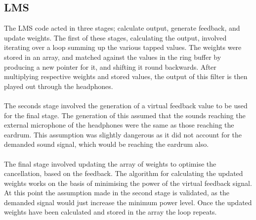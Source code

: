 \subsection{LMS}
\label{ssec:implelms}
The LMS code acted in three stages; calculate output, generate feedback, and update weights.
The first of these stages, calculating the output, involved iterating over a loop summing up the various tapped values.
The weights were stored in an array, and matched against the values in the ring buffer by producing a new pointer for it, and shifting it round backwards.
After multiplying respective weights and stored values, the output of this filter is then played out through the headphones.
\\
\\
The seconds stage involved the generation of a virtual feedback value to be used for the final stage.
The generation of this assumed that the sounds reaching the external microphone of the headphones were the same as those reaching the eardrum.
This assumption was slightly dangerous as it did not account for the demanded sound signal, which would be reaching the eardrum also.
\\
\\
The final stage involved updating the array of weights to optimise the cancellation, based on the feedback.
The algorithm for calculating the updated weights works on the basis of minimising the power of the virtual feedback signal.
At this point the assumption made in the second stage is validated, as the demanded signal would just increase the minimum power level.
Once the updated weights have been calculated and stored in the array the loop repeats.
